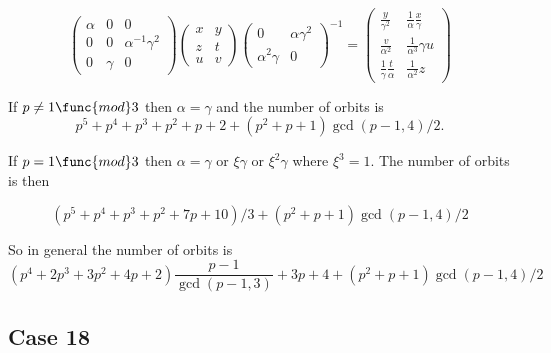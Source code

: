 \documentclass[10pt,thmsa]{article}
\begin{document}
\[
\left( 
\begin{array}{lll}
\alpha & 0 & 0 \\ 
0 & 0 & \alpha ^{-1}\gamma ^{2} \\ 
0 & \gamma & 0%
\end{array}%
\right) \left( 
\begin{array}{ll}
x & y \\ 
z & t \\ 
u & v%
\end{array}%
\right) \left( 
\begin{array}{ll}
0 & \alpha \gamma ^{2} \\ 
\alpha ^{2}\gamma & 0%
\end{array}%
\right) ^{-1}=\allowbreak \left( 
\begin{array}{cc}
\frac{y}{\gamma ^{2}} & \frac{1}{\alpha }\frac{x}{\gamma } \\ 
\frac{v}{\alpha ^{2}} & \frac{1}{\alpha ^{3}}\gamma u \\ 
\frac{1}{\gamma }\frac{t}{\alpha } & \frac{1}{\alpha ^{2}}z%
\end{array}%
\right) 
\]

If $p\neq 1\func{mod}3$ then $\alpha =\gamma $ and the number of orbits is 
\[
p^5+p^4+p^3+p^2+p+2+(p^2+p+1)\gcd (p-1,4)/2. 
\]

If $p=1\func{mod}3$ then $\alpha =\gamma $ or $\xi \gamma $ or $\xi ^2\gamma 
$ where $\xi ^3=1$. The number of orbits is then

\[
(p^5+p^4+p^3+p^2+7p+10)/3+(p^2+p+1)\gcd (p-1,4)/2 
\]

So in general the number of orbits is 
\[
\allowbreak (p^4+2p^3+3p^2+4p+2)\frac{p-1}{\gcd (p-1,3)}+3p+4+(p^2+p+1)\gcd
(p-1,4)/2 
\]

\subsection{Case 18}
\end{document}

